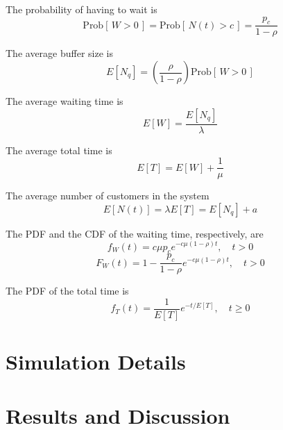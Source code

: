 \documentclass[12pt, a4paper]{article}
\begin{document}
The probability of having to wait is 
\begin{equation}
  \text{Prob}[\, W > 0 \,] = \text{Prob}[\, N(t) > c \,]
  = \frac{p_c}{1 - \rho}
\end{equation}

The average buffer size is 
\begin{equation}
  E[N_q] = \left( \frac{\rho}{1 - \rho} \right) \text{Prob}
  [\, W > 0 \,]
\end{equation}

The average waiting time is 
\begin{equation}
  E[W] =\frac{E[N_q]}{\lambda}
\end{equation}

The average total time is 
\begin{equation}
  E[T] = E[W] + \frac{1}{\mu}
\end{equation}

The average number of customers in the system 
\begin{equation}
  E[N(t)] = \lambda E[T] = E[N_q] + a  
\end{equation}

The PDF and the CDF of the waiting time, respectively, are 
\begin{equation}
  f_W(t) = c \mu p_c e^{-c \mu \left( 1 - \rho \right)t}, \quad t > 0
\end{equation}
\begin{equation}
  F_W(t) = 1 - \frac{p_c}{1 - \rho} e^{-c \mu \left( 1 - \rho \right)t}, \quad t > 0
\end{equation}

The PDF of the total time is 
\begin{equation}
  f_T(t) = \frac{1}{E[T]} e^{- t/ E[T] }, \quad t \ge 0 
\end{equation}

\section{Simulation Details}

\newpage
\section{Results and Discussion}
\end{document}
